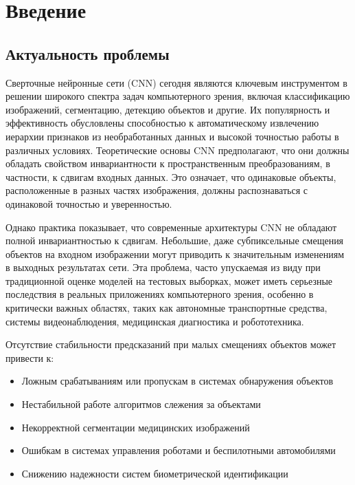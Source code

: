 \chapter*{Введение}							%
\label{intro}

\section*{Актуальность проблемы}
\label{intro:relevance}

Сверточные нейронные сети (CNN) сегодня являются ключевым инструментом в решении широкого спектра задач компьютерного зрения, включая классификацию изображений, сегментацию, детекцию объектов и другие. Их популярность и эффективность обусловлены способностью к автоматическому извлечению иерархии признаков из необработанных данных и высокой точностью работы в различных условиях. Теоретические основы CNN предполагают, что они должны обладать свойством инвариантности к пространственным преобразованиям, в частности, к сдвигам входных данных. Это означает, что одинаковые объекты, расположенные в разных частях изображения, должны распознаваться с одинаковой точностью и уверенностью.

Однако практика показывает, что современные архитектуры CNN не обладают полной инвариантностью к сдвигам. Небольшие, даже субпиксельные смещения объектов на входном изображении могут приводить к значительным изменениям в выходных результатах сети. Эта проблема, часто упускаемая из виду при традиционной оценке моделей на тестовых выборках, может иметь серьезные последствия в реальных приложениях компьютерного зрения, особенно в критически важных областях, таких как автономные транспортные средства, системы видеонаблюдения, медицинская диагностика и робототехника.

Отсутствие стабильности предсказаний при малых смещениях объектов может привести к:
\begin{itemize}
    \item Ложным срабатываниям или пропускам в системах обнаружения объектов
    \item Нестабильной работе алгоритмов слежения за объектами
    \item Некорректной сегментации медицинских изображений
    \item Ошибкам в системах управления роботами и беспилотными автомобилями
    \item Снижению надежности систем биометрической идентификации
\end{itemize}

